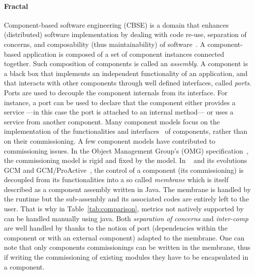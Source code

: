 \paragraph{Fractal}
Component-based software engineering (CBSE) is a domain that enhances
(distributed) software implementation by dealing with code re-use,
separation of concerns, and composability (thus maintainability) of
software~\cite{Szyperski:2002:CSB:515228}. A component-based
application is composed of a set of component instances connected
together. Such composition of components is called an
\emph{assembly}. A component is a black box that implements an
independent functionality of an application, and that interacts with
other components through well defined interfaces, called \emph{ports}.
Ports are used to decouple the component internals from its
interface. For instance, a port can be used to declare that the
component either provides a service ---in this case the port is
attached to an internal method--- or uses a service from another
component. Many component models focus on the implementation of the
functionalities and
interfaces~\cite{corba:omg06,Blair2009,baude:hal-01001043,Bernholdt01052006,bigot:inria-00388508,Coullon2017}
of components, rather than on their commissioning. A few component
models have contributed to commissioning issues. In the Object
Management Group's (OMG) specification~\cite{ccmdeploy:omg06}, the
commissioning model is rigid and fixed by the model. In
\fractal~\cite{Blair2009} and its evolutions GCM and
GCM/ProActive~\cite{baude:hal-01001043}, the control of a component
(\eg its commissioning) is decoupled from its functionalities into a
so called \emph{membrane} which is itself described as a component
assembly written in Java. The membrane is handled by the \fractal
runtime but the sub-assembly and its associated codes are entirely
left to the user. That is why in Table~\ref{tab:comparison}, metrics
not natively supported by \fractal can be handled manually using
java. Both \emph{separation of concerns} and \emph{inter-comp} are well
handled by \fractal thanks to the notion of port (dependencies within
the component or with an external component) adapted to the
membrane. One can note that only \fractal components commissionings
can be written in the membrane, thus if writing the commissioning of
existing modules they have to be encapsulated in a \fractal component.

